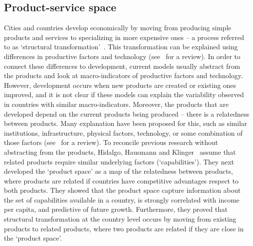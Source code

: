 \subsection{Product-service space}
\label{sec:pss}
Cities and countries develop economically by moving from producing simple products and services to specializing in more expensive ones -- a process referred to as `structural transformation'~\citep{smith1776, Romer1991,grossman1991,hidalgo2007}.
This transformation can be explained using differences in productive factors and technology (see~\citep{hausmann2011} for a review).
In order to connect these differences to development, 
current models usually abstract from the products and look at macro-indicators of productive factors and technology.
However, development occurs when new products are created or existing ones improved,
and it is not clear if these models can explain the variability observed in countries with similar macro-indicators.
Moreover, the products that are developed depend on the current products being produced -- there is a relatedness between products.
Many explanation have been proposed for this, 
such as similar institutions, infrastructure, physical factors, technology, or some combination of those factors (see~\cite{hidalgo2007} for a review).
To reconcile previous research without abstracting from the products,
Hidalgo, Hausmann and Klinger~\cite{hidalgo2007, hausmann2011, Hausmann2006,hidalgo2009} assume that related products require similar underlying factors (`capabilities').
They next developed the `product space' as a map of the relatedness between products,
where products are related if countries have competitive advantages respect to both products.
They showed that the product space capture information about the set of capabilities available in a country, 
is strongly correlated with income per capita, 
and predictive of future growth.
Furthermore, they proved that structural transformation at the country level occurs by moving from existing products to related products, 
where two products are related if they are close in the `product space'.

